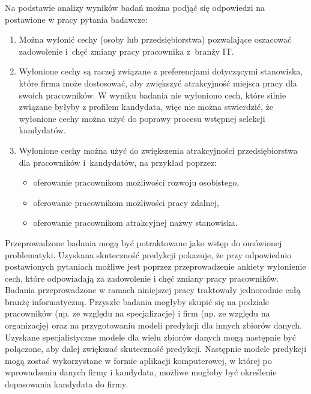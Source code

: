 Na podstawie analizy wyników badań można podjąć się odpowiedzi na postawione w pracy pytania badawcze:
\begin{enumerate}
    \item Można wyłonić cechy (osoby lub przedsiębiorstwa) pozwalające oszacować zadowolenie i~chęć zmiany pracy pracownika z~branży IT.
    \item Wyłonione cechy są raczej związane z preferencjami dotyczącymi stanowiska, które firma może dostosować, aby zwiększyć atrakcyjność miejsca pracy dla swoich pracowników. W wyniku badania nie wyłoniono cech, które silnie związane byłyby z profilem kandydata, więc nie można stwierdzić, że wyłonione cechy można użyć do poprawy procesu wstępnej selekcji kandydatów.
    \item Wyłonione cechy można użyć do zwiększenia atrakcyjności przedsiębiorstwa dla pracowników i~kandydatów, na przykład poprzez:
    \begin{itemize}
        \item oferowanie pracownikom możliwości rozwoju osobistego,
        \item oferowanie pracownikom możliwości pracy zdalnej,
        \item oferowanie pracownikom atrakcyjnej nazwy stanowiska.
        \end{itemize}
\end{enumerate}

Przeprowadzone badania mogą być potraktowane jako wstęp do omówionej problematyki.
Uzyskana skuteczność predykcji pokazuje, że przy odpowiednio postawionych pytaniach możliwe jest poprzez przeprowadzenie ankiety wyłonienie cech, które odpowiadają za zadowolenie i chęć zmiany pracy pracowników.
Badania przeprowadzone w ramach niniejszej pracy traktowały jednorodnie całą branżę informatyczną.
Przyszłe badania mogłyby skupić się na podziale pracowników (np. ze względu na specjalizacje) i firm (np. ze względu na organizację) oraz na przygotowaniu modeli predykcji dla innych zbiorów danych.
Uzyskane specjalistyczne modele dla wielu zbiorów danych mogą następnie być połączone, aby dalej zwiększać skuteczność predykcji.
Następnie modele predykcji mogą zostać wykorzystane w formie aplikacji komputerowej, w której po wprowadzeniu danych firmy i kandydata, możliwe mogłoby być określenie dopasowania kandydata do firmy.


\thispagestyle{normal}
